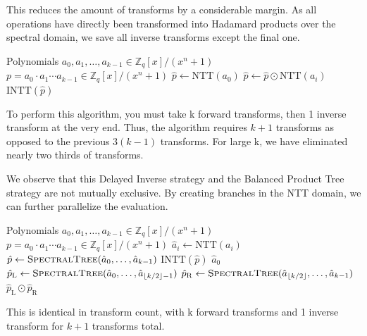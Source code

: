 \documentclass[runningheads]{llncs}
\begin{document}
This reduces the amount of transforms by a considerable margin. As all operations have directly been transformed into Hadamard products over the spectral domain, we save all inverse transforms except the final one. 

\begin{algorithm}
\caption{Delayed Inverse NTT Multiplication}
\begin{algorithmic}[1]
\Require Polynomials $a_0, a_1, \dots, a_{k-1} \in \mathbb{Z}_q[x]/(x^n+1)$
\Ensure $p = a_0 \cdot a_1 \cdots a_{k-1} \in \mathbb{Z}_q[x]/(x^n+1)$
\State $\hat{p} \gets \mathrm{NTT}(a_0)$
    \State $\hat{p} \gets \hat{p} \odot \mathrm{NTT}(a_i)$
\EndFor
\State \Return $\mathrm{INTT}(\hat{p})$
\end{algorithmic}
\end{algorithm}

To perform this algorithm, you must take k forward transforms, then 1 inverse transform at the very end. Thus, the algorithm requires $k+1$ transforms as opposed to the previous $3(k-1)$ transforms. For large k, we have eliminated nearly two thirds of transforms.

We observe that this Delayed Inverse strategy and the Balanced Product Tree strategy are not mutually exclusive. By creating branches in the NTT domain, we can further parallelize the evaluation. 

\begin{algorithm}[htbp]
\caption{Hybrid Delayed Inverse Product Tree}
\begin{algorithmic}[1]
\Require Polynomials $a_0, a_1, \ldots, a_{k-1} \in \mathbb{Z}_q[x]/(x^n+1)$
\Ensure $p = a_0 \cdot a_1 \cdots a_{k-1} \in \mathbb{Z}_q[x]/(x^n+1)$
    \State $\hat{a}_i \gets \text{NTT}(a_i)$
\EndFor
\State $\hat{p} \gets \Call{SpectralTree}{\hat{a}_0, \ldots, \hat{a}_{k-1}}$
\State \Return $\text{INTT}(\hat{p})$
\Statex
{}
    \State \Return $\hat{a}_0$
\EndIf
\State $\hat{p}_{\mathrm{L}} \gets \Call{SpectralTree}{\hat{a}_0, \ldots, \hat{a}_{\lfloor k/2 \rfloor - 1}}$
\State $\hat{p}_{\mathrm{R}} \gets \Call{SpectralTree}{\hat{a}_{\lfloor k/2 \rfloor}, \ldots, \hat{a}_{k-1}}$
\State \Return $\hat{p}_{\mathrm{L}} \odot \hat{p}_{\mathrm{R}}$
\EndFunction
\end{algorithmic}
\end{algorithm}

This is identical in transform count, with k forward transforms and 1 inverse transform for $k+1$ transforms total.
\end{document}
